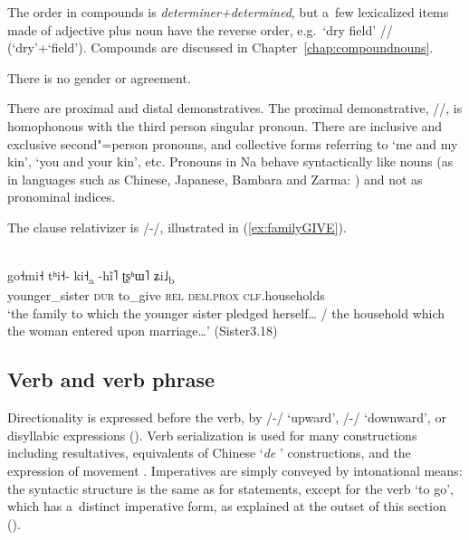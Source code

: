 The order in compounds is \textit{determiner+determined}, but a~few lexicalized items made of adjective plus noun have the reverse order, e.g.~‘dry field’ // (‘dry’{\allowbreak}+‘field’). Compounds are discussed in Chapter~\ref{chap:compoundnouns}.

There is no gender or agreement. 

There are proximal and distal demonstratives. The proximal demonstrative, //, is homophonous with the third person singular pronoun. There are inclusive and exclusive second"=person pronouns, and collective forms referring to ‘me and my kin’, ‘you and your kin’, etc. Pronouns in Na behave syntactically like nouns (as in languages such as Chinese, Japanese, Bambara and Zarma: \citealt[29]{creissels1995syntaxe}) and not as pronominal indices.

\newpage
The clause relativizer is /-/, illustrated in (\ref{ex:familyGIVE}).

\begin{exe}
	\ex
	\label{ex:familyGIVE}
	\\
	\gll go˧mi˧		tʰi˧-		ki˧\textsubscript{a}			-hĩ˥		ʈʂʰɯ˥			ʑi˩\textsubscript{b}\\
	younger\_sister		\textsc{dur}	to\_give			\textsc{rel}		\textsc{dem.prox}		\textsc{clf}.households\\
	\glt ‘the family to which the younger sister pledged herself… / the household which the woman entered upon marriage…’ (Sister3.18)
\end{exe}


\subsection{Verb and verb phrase}
\label{sec:vvphrase}

Directionality is expressed before the verb, by /-/ ‘upward’, /-/ ‘downward’, or disyllabic expressions (). 
Verb serialization is used for many constructions including resultatives, equivalents of Chinese ‘\textit{de} ’ constructions, and the expression of movement \citep[397-405]{lidz2010}. Imperatives are simply conveyed by intonational means: the syntactic structure is the same as for statements, except for the verb ‘to go’, which has a~distinct {imperative} form, as explained at the outset of this section ().

